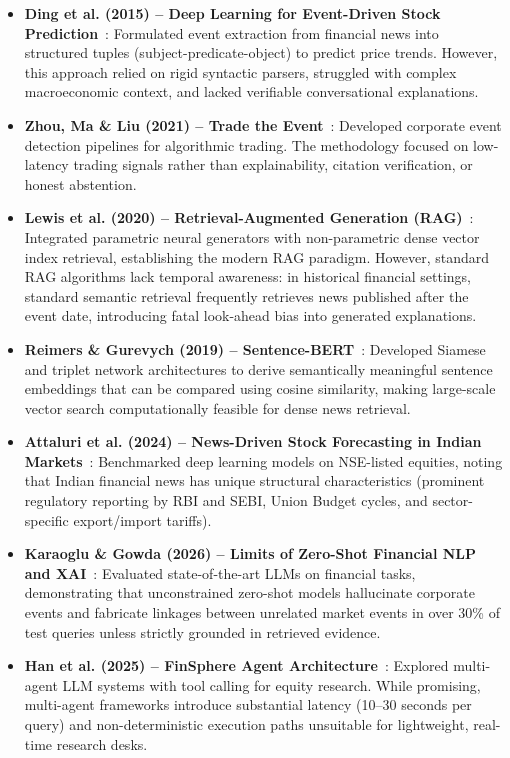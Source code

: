 \documentclass{article}
\begin{document}
\begin{itemize}
		\item \textbf{Ding et al. (2015) -- Deep Learning for Event-Driven Stock Prediction}~\cite{ding2015deep}: Formulated event extraction from financial news into structured tuples (subject-predicate-object) to predict price trends. However, this approach relied on rigid syntactic parsers, struggled with complex macroeconomic context, and lacked verifiable conversational explanations.
		\item \textbf{Zhou, Ma \& Liu (2021) -- Trade the Event}~\cite{zhou2021trade}: Developed corporate event detection pipelines for algorithmic trading. The methodology focused on low-latency trading signals rather than explainability, citation verification, or honest abstention.
		\item \textbf{Lewis et al. (2020) -- Retrieval-Augmented Generation (RAG)}~\cite{lewis2020rag}: Integrated parametric neural generators with non-parametric dense vector index retrieval, establishing the modern RAG paradigm. However, standard RAG algorithms lack temporal awareness: in historical financial settings, standard semantic retrieval frequently retrieves news published after the event date, introducing fatal look-ahead bias into generated explanations.
		\item \textbf{Reimers \& Gurevych (2019) -- Sentence-BERT}~\cite{reimers2019sentence}: Developed Siamese and triplet network architectures to derive semantically meaningful sentence embeddings that can be compared using cosine similarity, making large-scale vector search computationally feasible for dense news retrieval.
		\item \textbf{Attaluri et al. (2024) -- News-Driven Stock Forecasting in Indian Markets}~\cite{attaluri2024news}: Benchmarked deep learning models on NSE-listed equities, noting that Indian financial news has unique structural characteristics (prominent regulatory reporting by RBI and SEBI, Union Budget cycles, and sector-specific export/import tariffs).
		\item \textbf{Karaoglu \& Gowda (2026) -- Limits of Zero-Shot Financial NLP and XAI}~\cite{karaoglu2026can}: Evaluated state-of-the-art LLMs on financial tasks, demonstrating that unconstrained zero-shot models hallucinate corporate events and fabricate linkages between unrelated market events in over 30\% of test queries unless strictly grounded in retrieved evidence.
		\item \textbf{Han et al. (2025) -- FinSphere Agent Architecture}~\cite{han2025finsphere}: Explored multi-agent LLM systems with tool calling for equity research. While promising, multi-agent frameworks introduce substantial latency (10--30 seconds per query) and non-deterministic execution paths unsuitable for lightweight, real-time research desks.

\end{itemize}
\end{document}
